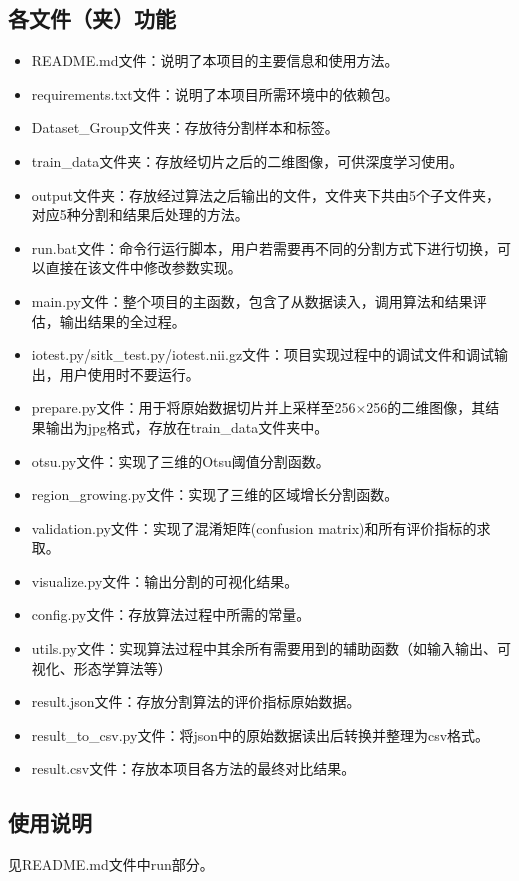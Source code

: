\documentclass[UTF8]{ctexart}
\begin{document}
\subsection{各文件（夹）功能}
\begin{itemize}
    \item README.md文件：说明了本项目的主要信息和使用方法。
    \item requirements.txt文件：说明了本项目所需环境中的依赖包。
    \item Dataset\_Group文件夹：存放待分割样本和标签。
    \item train\_data文件夹：存放经切片之后的二维图像，可供深度学习使用。
    \item output文件夹：存放经过算法之后输出的文件，文件夹下共由5个子文件夹，对应5种分割和结果后处理的方法。
    \item run.bat文件：命令行运行脚本，用户若需要再不同的分割方式下进行切换，可以直接在该文件中修改参数实现。
    \item main.py文件：整个项目的主函数，包含了从数据读入，调用算法和结果评估，输出结果的全过程。
    \item iotest.py/sitk\_test.py/iotest.nii.gz文件：项目实现过程中的调试文件和调试输出，用户使用时不要运行。
    \item prepare.py文件：用于将原始数据切片并上采样至256$\times$256的二维图像，其结果输出为jpg格式，存放在train\_data文件夹中。
    \item otsu.py文件：实现了三维的Otsu阈值分割函数。
    \item region\_growing.py文件：实现了三维的区域增长分割函数。
    \item validation.py文件：实现了混淆矩阵(confusion matrix)和所有评价指标的求取。
    \item visualize.py文件：输出分割的可视化结果。
    \item config.py文件：存放算法过程中所需的常量。
    \item utils.py文件：实现算法过程中其余所有需要用到的辅助函数（如输入输出、可视化、形态学算法等）
    \item result.json文件：存放分割算法的评价指标原始数据。
    \item result\_to\_csv.py文件：将json中的原始数据读出后转换并整理为csv格式。
    \item result.csv文件：存放本项目各方法的最终对比结果。
\end{itemize}

\subsection{使用说明}
见README.md文件中run部分。
\end{document}
